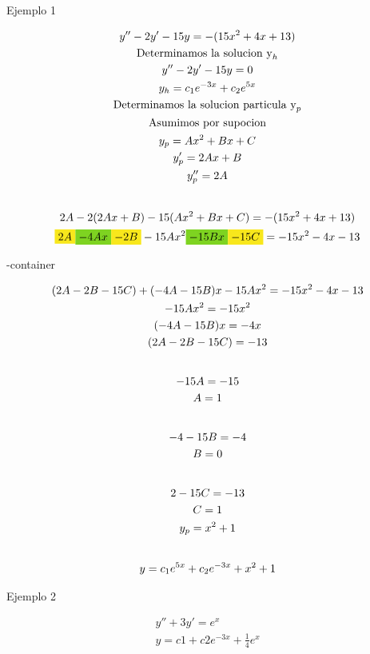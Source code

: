 \documentclass{article}
\begin{document}
Ejemplo 1


\begin{gather*}
y''-2y'-15y = -(15x^{2}+4x+13) \\
\text{Determinamos la solucion y}_{h} \\
y''-2y'-15y=0 \\
y_{h} = c_{1}e^{-3x}+c_{2}e^{5x} \\
\text{Determinamos la solucion particula y}_{p} \\
\text{Asumimos por supocion} \\
y_{p} = Ax^{2}+Bx+C \\
y'_{p} = 2Ax+B \\
y''_{p}=2A \\
\vspace{0.5em} \\
2A-2(2Ax+B)-15(Ax^{2}+Bx+C) = -(15x^{2}+4x+13) \\
\text{\colorbox[RGB]{248,231,28}{$2A$}}\text{\colorbox[RGB]{126,211,33}{$-4Ax$}}\text{\colorbox[RGB]{248,231,28}{$-2B$}}-15Ax^{2}\text{\colorbox[RGB]{126,211,33}{$-15Bx$}}\text{\colorbox[RGB]{248,231,28}{$-15C$}} = -15x^{2}-4x-13
\end{gather*}


\image-container


\begin{gather*}
(2A-2B-15C) +(-4A-15B)x-15Ax^{2}=-15x^{2}-4x-13 \\
-15Ax^{2} = -15x^{2} \\
(-4A-15B)x =-4x \\
(2A-2B-15C)=-13 \\
\vspace{0.5em} \\
-15A = -15 \\
A =1 \\
\vspace{0.5em} \\
-4-15B =-4 \\
B= 0 \\
\vspace{0.5em} \\
2-15C=-13 \\
C=1 \\
y_{p} = x^{2}+1 \\
\vspace{0.5em} \\
y =c_{1}e^{5x}+c_{2}e^{-3x}+ x^{2}+1
\end{gather*}


Ejemplo 2


\begin{gather*}
y''+3y' = e^{x} \\
y= c1+c2e^{-3x}+\frac{1}{4}e^{x}
\end{gather*}
\end{document}
